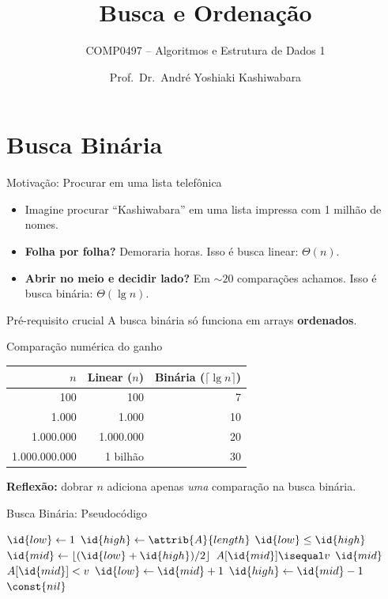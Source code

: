 \documentclass[aspectratio=169]{beamer}
\title{Busca e Ordenação}
\subtitle{COMP0497 -- Algoritmos e Estrutura de Dados 1}
\author{Prof.\ Dr.\ André Yoshiaki Kashiwabara}
\date{}
\begin{document}
\section{Busca Binária}

\begin{frame}{Motivação: Procurar em uma lista telefônica}
\begin{itemize}
\item Imagine procurar ``Kashiwabara'' em uma lista impressa com 1 milhão de nomes.
\item \textbf{Folha por folha?} Demoraria horas. Isso é \alert{busca linear}: $\Theta(n)$.
\item \textbf{Abrir no meio e decidir lado?} Em $\sim 20$ comparações achamos. Isso é \alert{busca binária}: $\Theta(\lg n)$.
\end{itemize}
\begin{block}{Pré-requisito crucial}
A busca binária só funciona em arrays \textbf{ordenados}.
\end{block}
\end{frame}

\begin{frame}{Comparação numérica do ganho}
\centering
\begin{tabular}{rrr}
\toprule
$n$ & Linear ($n$) & Binária ($\lceil\lg n\rceil$) \\
\midrule
100 & 100 & 7 \\
1.000 & 1.000 & 10 \\
1.000.000 & 1.000.000 & 20 \\
1.000.000.000 & 1 bilhão & 30 \\
\bottomrule
\end{tabular}

\vspace{0.4cm}
\textbf{Reflexão:} dobrar $n$ adiciona apenas \emph{uma} comparação na busca binária.
\end{frame}

\begin{frame}[fragile]{Busca Binária: Pseudocódigo}
\begin{codebox}
\li $\id{low} \gets 1$
\li $\id{high} \gets \attrib{A}{length}$
\li \While $\id{low} \leq \id{high}$
\li \Do $\id{mid} \gets \lfloor (\id{low}+\id{high})/2 \rfloor$
\li      \If $A[\id{mid}] \isequal v$
\li          \Then \Return $\id{mid}$
             \End
\li      \If $A[\id{mid}] < v$
\li          \Then $\id{low} \gets \id{mid}+1$
\li          \Else $\id{high} \gets \id{mid}-1$
             \End
     \End
\li \Return $\const{nil}$
\end{codebox}
\end{frame}
\end{document}

